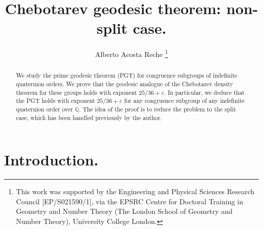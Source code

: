 \documentclass{article}
\theoremstyle{named}
\newcommand{\Q}{\mathbb{Q}}
\begin{document}
\title{Chebotarev geodesic theorem: non-split case.}
\author{Alberto Acosta Reche \thanks{This work was supported by the Engineering and Physical Sciences Research Council [EP/S021590/1], via the
EPSRC Centre for Doctoral Training in Geometry and Number Theory (The London School of Geometry and Number
Theory), University College London.}}
\date{}
\maketitle

\begin{abstract}
We study the prime geodesic theorem (PGT) for congruence subgroups of indefinite quaternion orders. We prove that the geodesic analogue of the Chebotarev density theorem for these groups holds with exponent $25/36 + \varepsilon$. In particular, we deduce that the PGT holds with exponent $25/36 + \varepsilon$ for any congruence subgroup of any indefinite quaternion order over $\Q$. The idea of the proof is to reduce the problem to the split case, which has been handled previously by the author. 
\end{abstract}



\section{Introduction.}
\end{document}

